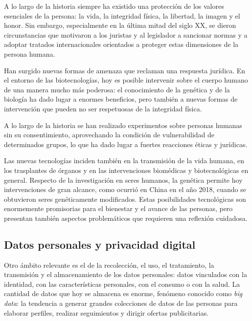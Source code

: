 \documentclass[12pt,oneside]{book}
\begin{document}
A lo largo de la historia siempre ha existido una protección de los valores esenciales de la persona: la vida, la integridad física, la libertad, la imagen y el honor. Sin embargo, especialmente en la última mitad del siglo XX, se dieron circunstancias que motivaron a los juristas y al legislador a sancionar normas y a adoptar tratados internacionales orientados a proteger estas dimensiones de la persona humana.

Han surgido nuevas formas de amenaza que reclaman una respuesta jurídica. En el entorno de las biotecnologías, hoy es posible intervenir sobre el cuerpo humano de una manera mucho más poderosa: el conocimiento de la genética y de la biología ha dado lugar a enormes beneficios, pero también a nuevas formas de intervención que pueden no ser respetuosas de la integridad física.

\begin{note}
A lo largo de la historia se han realizado experimentos sobre personas humanas sin su consentimiento, aprovechando la condición de vulnerabilidad de determinados grupos, lo que ha dado lugar a fuertes reacciones éticas y jurídicas.
\end{note}

Las nuevas tecnologías inciden también en la transmisión de la vida humana, en los trasplantes de órganos y en las intervenciones biomédicas y biotecnológicas en general. Respecto de la investigación en seres humanos, la genética permite hoy intervenciones de gran alcance, como ocurrió en China en el año 2018, cuando se obtuvieron seres genéticamente modificados. Estas posibilidades tecnológicas son enormemente promisorias para el bienestar y el avance de las personas, pero presentan también aspectos problemáticos que requieren una reflexión cuidadosa.

\subsection{Datos personales y privacidad digital}

Otro ámbito relevante es el de la recolección, el uso, el tratamiento, la transmisión y el almacenamiento de los datos personales: datos vinculados con la identidad, con las características personales, con el consumo o con la salud. La cantidad de datos que hoy se almacena es enorme, fenómeno conocido como \textit{big data}: la tendencia a generar grandes colecciones de datos de las personas para elaborar perfiles, realizar seguimientos y dirigir ofertas publicitarias.
\end{document}
